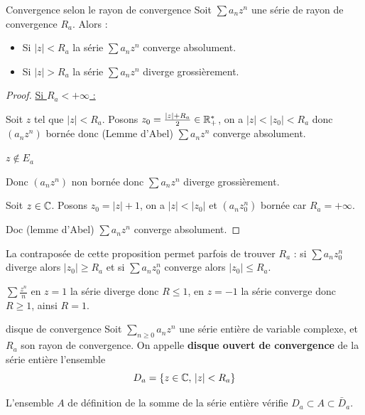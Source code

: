 \begin{proposition}{Convergence selon le rayon de convergence}{}
    Soit $\sum a_n z^n$ une série de rayon de convergence $R_a$. Alors : 
    \begin{itemize}
        \item Si $|z| < R_a$ la série $\sum a_n z^n$ converge absolument.
        \item Si $|z| > R_a$ la série $\sum a_n z^n$ diverge grossièrement.
    \end{itemize}
\end{proposition}


\begin{proof} \uline{Si $R_a < +\infty$ :}

    Soit $z$ tel que $|z| < R_a$. 
    Posons $z_0 = \frac{|z| + R_a}{2} \in \mathbb{R}_+^*$, on a $|z| < |z_0| < R_a$ donc 
    $(a_n z^n)$ bornée donc (Lemme d'Abel) $\sum a_n z^n$ converge absolument.

     $z \notin E_a$ 

    \svspace Donc $(a_n z^n)$ non bornée donc $\sum a_n z^n$ diverge grossièrement.


    \svspace Soit $z \in \mathbb{C}$. Posons $z_0 = |z| + 1$, on a $|z| < |z_0|$ et $(a_nz_0^n)$ bornée car $R_a = + \infty$. 

    Doc (lemme d'Abel) $\sum a_n z^n$ converge absolument.
\end{proof}

\begin{remarque}
    La contraposée de cette proposition permet parfois de trouver $R_a$ : 
    si $\sum a_n z_0^n$ diverge alors $|z_0| \geqslant R_a$ et si $\sum a_n z_0^n$ converge 
    alors $|z_0| \leqslant R_a$.
\end{remarque}

\begin{exemple}
    $\sum \frac{z^n} n$ en $z = 1$ la série diverge donc $R \leqslant 1$, en $z = - 1$ la série 
    converge donc $R \geqslant 1$, ainsi $R = 1$.
\end{exemple}


\begin{definition}{disque de convergence}{}
    Soit $\sum_{n \geqslant 0} a_n z^n$ une série entière de variable complexe, et $R_a$ 
    son rayon de convergence. On appelle \textbf{disque ouvert de convergence} de la série entière 
    l'ensemble 
    $$D_a = \{z \in \mathbb{C}, \, |z| < R_a \}$$

    L'ensemble $A$ de définition de la somme de la série entière vérifie $D_a \subset A \subset \bar D_a$.
\end{definition}

